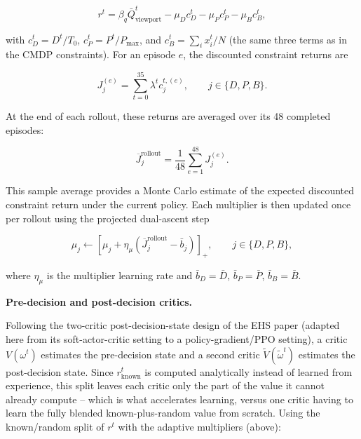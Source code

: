 \documentclass[10pt,conference,a4paper]{IEEEtran}
\newcommand{\head}[1]{%
    \vspace{2pt}
    \noindent
    \textbf{#1}
    \hspace{2pt}
}
\begin{document}
\begin{equation}
r^t
=
\beta_q\bar Q_{\mathrm{viewport}}^t
-\mu_Dc_D^t
-\mu_Pc_P^t
-\mu_Bc_B^t,
\end{equation}

with $c_D^t=D^t/T_0$, $c_P^t=P^t/P_{\max}$, and
$c_B^t=\sum_i x_i^t/N$ (the same three terms as in the CMDP
constraints). For an episode $e$, the discounted constraint
returns are

\begin{equation}
J_j^{(e)}
=
\sum_{t=0}^{35}
\lambda^t c_j^{t,(e)},
\qquad
j\in\{D,P,B\}.
\end{equation}

At the end of each rollout, these returns are averaged over its 48
completed episodes:

\begin{equation}
\overline J_j^{\mathrm{rollout}}
=
\frac{1}{48}
\sum_{e=1}^{48}J_j^{(e)}.
\end{equation}

This sample average provides a Monte Carlo estimate of the expected
discounted constraint return under the current policy. Each
multiplier is then updated once per rollout using the projected
dual-ascent step

\begin{equation}
\mu_j
\leftarrow
\left[
\mu_j
+
\eta_\mu
\left(
\overline J_j^{\mathrm{rollout}}
-
\bar b_j
\right)
\right]_+,
\qquad
j\in\{D,P,B\},
\end{equation}

where $\eta_\mu$ is the multiplier learning rate and
$\bar b_D=\bar D$, $\bar b_P=\bar P$, $\bar b_B=\bar B$.


\head{Pre-decision and post-decision critics.}
Following the two-critic post-decision-state design of the EHS
paper (adapted here from its soft-actor-critic setting to a
policy-gradient/PPO setting), a critic $V(\omega^t)$ estimates
the pre-decision state and a second critic
$\widetilde V(\widetilde\omega^t)$ estimates the post-decision
state. Since $r_{\mathrm{known}}^t$ is computed analytically
instead of learned from experience, this split leaves each
critic only the part of the value it cannot already compute --
which is what accelerates learning, versus one critic having to
learn the fully blended known-plus-random value from scratch.
Using the known/random split of $r^t$ with the adaptive
multipliers (above):
\end{document}
